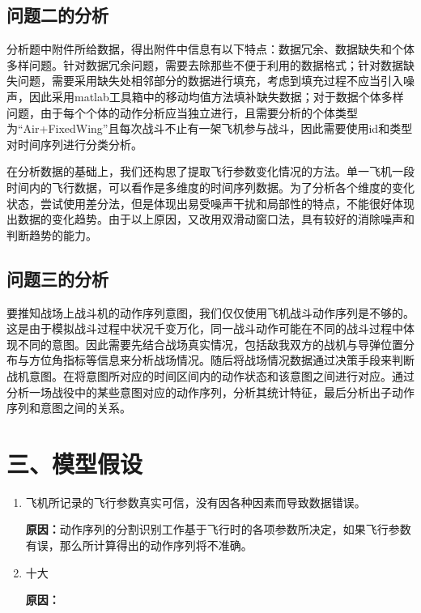\documentclass{my_paper}
\begin{document}
\subsection{问题二的分析}

分析题中附件所给数据，得出附件中信息有以下特点：数据冗余、数据缺失和个体多样问题。针对数据冗余问题，需要去除那些不便于利用的数据格式；针对数据缺失问题，需要采用缺失处相邻部分的数据进行填充，考虑到填充过程不应当引入噪声，因此采用matlab工具箱中的移动均值方法填补缺失数据；对于数据个体多样问题，由于每个个体的动作分析应当独立进行，且需要分析的个体类型为“Air+FixedWing”且每次战斗不止有一架飞机参与战斗，因此需要使用id和类型对时间序列进行分类分析。

在分析数据的基础上，我们还构思了提取飞行参数变化情况的方法。单一飞机一段时间内的飞行数据，可以看作是多维度的时间序列数据。为了分析各个维度的变化状态，尝试使用差分法，但是体现出易受噪声干扰和局部性的特点，不能很好体现出数据的变化趋势。由于以上原因，又改用双滑动窗口法，具有较好的消除噪声和判断趋势的能力。

\subsection{问题三的分析}

要推知战场上战斗机的动作序列意图，我们仅仅使用飞机战斗动作序列是不够的。这是由于模拟战斗过程中状况千变万化，同一战斗动作可能在不同的战斗过程中体现不同的意图。因此需要先结合战场真实情况，包括敌我双方的战机与导弹位置分布与方位角指标等信息来分析战场情况。随后将战场情况数据通过决策手段来判断战机意图。在将意图所对应的时间区间内的动作状态和该意图之间进行对应。通过分析一场战役中的某些意图对应的动作序列，分析其统计特征，最后分析出子动作序列和意图之间的关系。

\section{三、模型假设}
\begin{enumerate}
    \item 飞机所记录的飞行参数真实可信，没有因各种因素而导致数据错误。
    
    \textbf{原因：}动作序列的分割识别工作基于飞行时的各项参数所决定，如果飞行参数有误，那么所计算得出的动作序列将不准确。

    \item 十大
    
    \textbf{原因：}
    
\end{enumerate}
\end{document}
